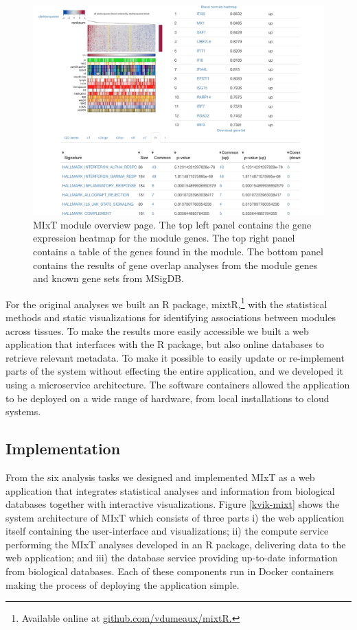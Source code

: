 \begin{figure}[h!]
\centering
\includegraphics[width=\columnwidth]{figures/module.png}
    \caption[MIxT module overview page.]{MIxT module overview page.
The top left panel
contains the gene expression heatmap for the module genes. The top right panel
contains a table of the genes found in the module. The bottom panel contains the
results of gene overlap analyses from the module genes and known gene sets from
MSigDB.}
\label{fig_first_case}
\end{figure} 

For the original analyses we built an R package, mixtR,\footnote{Available
online at \url{github.com/vdumeaux/mixtR.}} with the statistical methods and
static visualizations for identifying associations between modules across
tissues. To make the results more easily accessible we built a web application
that interfaces with the R package, but also online databases to retrieve
relevant metadata. To make it possible to easily update or re-implement parts of
the system without effecting the entire application, and we developed it using a
microservice architecture. The software containers allowed the application to be
deployed on a wide range of hardware, from local installations to cloud systems.

\subsection{Implementation} 
From the six analysis tasks we designed and implemented MIxT as a web
application that integrates statistical analyses and information from biological
databases together with interactive visualizations. Figure \ref{kvik-mixt} shows
the system architecture of MIxT which consists of three parts i) the
web application itself containing the user-interface and visualizations; ii) the
compute service performing the MIxT analyses developed in an R package,
delivering data to the web application; and iii) the database service providing
up-to-date information from biological databases.  Each of these components run
in Docker containers making the process of deploying the application simple. 


